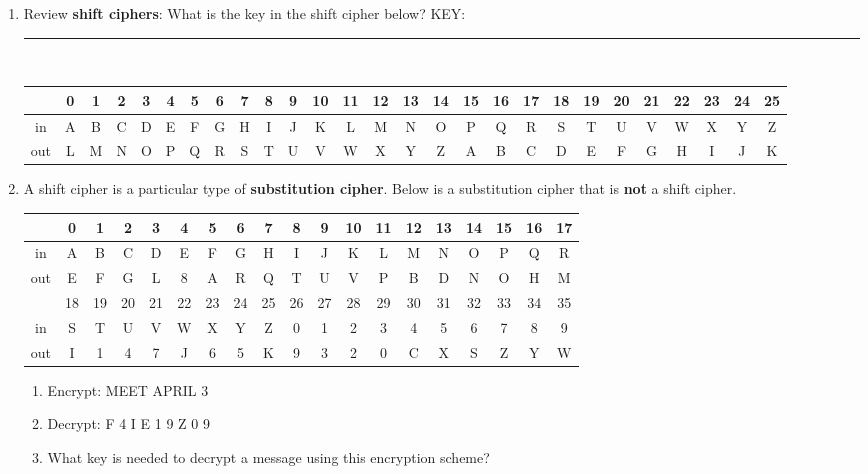 \documentclass[12pt]{article}
\renewcommand{\emph}[1]{\textsf{\textbf{#1}}}
\newcommand{\ans}[1][1in]{\rule{#1}{.5pt}}
\begin{document}
\begin{enumerate}
\item Review \emph{shift ciphers}: What is the key in the shift cipher below? KEY: \ans\\

\hspace*{-2.2cm}
{\scriptsize
\begin{tabular}{|c|c|c|c|c|c|c|c|c|c|c|c|c|c|c|c|c|c|c|c|c|c|c|c|c|c|c|}
\hline
&0&1&2&3&4&5&6&7&8&9&10&11&12&13&14&15&16&17&18&19&20&21&22&23&24&25\\ \hline \hline
in& A&B&C&D&E&F&G&H&I&J&K&L&M&N&O&P&Q&R&S&T&U&V&W&X&Y&Z\\  \hline
out&L &M&N&O&P&Q&R&S&T&U&V&W&X&Y&Z&A&B&C&D&E&F&G&H&I&J&K\\[12pt]
\hline
\end{tabular}
}
\item A shift cipher is a particular type of \emph{substitution cipher}. Below is a substitution cipher that is \textbf{not} a shift cipher.\\


{\scriptsize
\begin{tabular}{|c|c|c|c|c|c|c|c|c|c|c|c|c|c|c|c|c|c|c|}
\hline
&0&1&2&3&4&5&6&7&8&9&10&11&12&13&14&15&16&17\\ \hline \hline
in& A&B&C&D&E&F&G&H&I&J&K&L&M&N&O&P&Q&R\\  \hline
out&E&F&G&L&8&A&R&Q&T&U&V&P&B&D&N&O&H&M\\
\hline \hline
&18&19&20&21&22&23&24&25&26&27&28&29&30&31&32&33&34&35\\ \hline \hline
in&S&T&U&V&W&X&Y&Z&0&1&2&3&4&5&6&7&8&9\\ \hline
out&I&1&4&7&J&6&5&K&9&3&2&0&C&X&S&Z&Y&W \\
[12pt]
\hline
\end{tabular}
}
	\begin{enumerate}
	\item Encrypt: \textsf{MEET APRIL 3}
	
	\vfill
	
	\item Decrypt: \textsf{F 4 I E 1 9 Z 0 9}
	
	\vfill
	
	\item What key is needed to decrypt a message using this encryption scheme?
	

\end{enumerate}
\end{enumerate}
\end{document}
